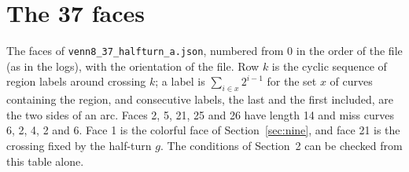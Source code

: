 \documentclass[11pt]{article}
\theoremstyle{remark}
\begin{document}
\normalsize
\clearpage
\appendix
\section{The 37 faces}\label{app:faces}

The faces of \texttt{venn8\_37\_halfturn\_a.json}, numbered from 0 in the order of the file (as in the logs), with
the orientation of the file. Row $k$ is the cyclic sequence of region labels around crossing $k$; a label is
$\sum_{i\in x}2^{i-1}$ for the set $x$ of curves containing the region, and consecutive labels, the last and the
first included, are the two sides of an arc. Faces 2, 5, 21, 25 and 26 have length 14 and miss curves 6, 2, 4, 2
and 6. Face 1 is the colorful face of Section~\ref{sec:nine}, and face 21 is the crossing fixed by the half-turn $g$.
The conditions of Section~2 can be checked from this table alone.
\end{document}
